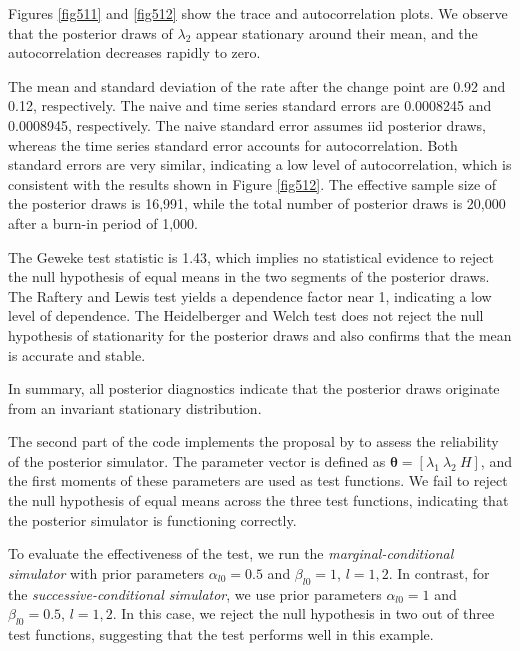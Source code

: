 Figures \ref{fig511} and \ref{fig512} show the trace and autocorrelation plots. We observe that the posterior draws of $\lambda_2$ appear stationary around their mean, and the autocorrelation decreases rapidly to zero.

The mean and standard deviation of the rate after the change point are 0.92 and 0.12, respectively. The naive and time series standard errors are 0.0008245 and 0.0008945, respectively. The naive standard error assumes iid posterior draws, whereas the time series standard error accounts for autocorrelation. Both standard errors are very similar, indicating a low level of autocorrelation, which is consistent with the results shown in Figure \ref{fig512}. The effective sample size of the posterior draws is 16,991, while the total number of posterior draws is 20,000 after a burn-in period of 1,000.

The Geweke test statistic is 1.43, which implies no statistical evidence to reject the null hypothesis of equal means in the two segments of the posterior draws. The Raftery and Lewis test yields a dependence factor near 1, indicating a low level of dependence. The Heidelberger and Welch test does not reject the null hypothesis of stationarity for the posterior draws and also confirms that the mean is accurate and stable.

In summary, all posterior diagnostics indicate that the posterior draws originate from an invariant stationary distribution.

The second part of the code implements the proposal by \cite{geweke2004getting} to assess the reliability of the posterior simulator. The parameter vector is defined as $\bm{\theta} = [\lambda_1 \ \lambda_2 \ H]$, and the first moments of these parameters are used as test functions. We fail to reject the null hypothesis of equal means across the three test functions, indicating that the posterior simulator is functioning correctly.

To evaluate the effectiveness of the test, we run the \textit{marginal-conditional simulator} with prior parameters $\alpha_{l0} = 0.5$ and $\beta_{l0} = 1$, $l = 1, 2$. In contrast, for the \textit{successive-conditional simulator}, we use prior parameters $\alpha_{l0} = 1$ and $\beta_{l0} = 0.5$, $l = 1, 2$. In this case, we reject the null hypothesis in two out of three test functions, suggesting that the test performs well in this example.


